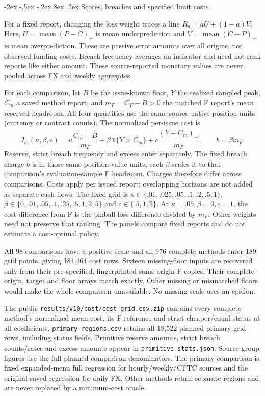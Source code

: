 \documentclass[12pt,a4paper]{article}
\makeatletter
\renewcommand\section{\@startsection{section}{1}{\z@}%
  {-2ex \@plus -.5ex \@minus -.2ex}{.8ex \@plus .2ex}%
  {\normalfont\large\bfseries}}
\makeatother
\begin{document}
\FloatBarrier


\section{Scores, breaches and specified limit costs}\label{sup:preference}\label{sup:frontier-0}\label{sup:wp3-murphy}\label{sup:v10-cost}\label{sup:v10-diagnostics}

For a fixed report, changing the loss weight traces a line
\(R_a=aU+(1-a)V\). Here, \(U=\operatorname{mean}(P-C)_+\) is mean underprediction and
\(V=\operatorname{mean}(C-P)_+\) is mean overprediction. These are passive error amounts over all
origins, not observed funding costs. Breach frequency averages an indicator and
need not rank reports like either amount. These source-reported monetary values are never pooled across FX and weekly aggregates.

For each comparison, let $B$ be the issue-known floor, $Y$ the realized sampled peak,
$C_m$ a saved method report, and $m_F=\overline{C_F-B}>0$ the matched F report's
mean reserved headroom. All four quantities use the same source-native position
units (currency or contract counts). The normalized per-issue cost is
\[
J_m(\kappa,\beta,c)=\kappa\frac{\overline{C_m-B}}{m_F}
+\beta\,\overline{\mathbf 1\{Y>C_m\}}
+c\frac{\overline{(Y-C_m)_+}}{m_F},\qquad b=\beta m_F.
\]
Reserve, strict breach frequency and excess enter separately. The fixed breach
charge $b$ is in those same position-value units; each $\beta$ scales it to that
comparison's evaluation-sample F headroom. Charges therefore differ across
comparisons. Costs apply per issued report; overlapping horizons are not
added as separate cash flows.
The fixed grid is $\kappa\in\{.01,.025,.05,.1,.2,.5,1\}$,
$\beta\in\{0,.01,.05,.1,.25,.5,1,2,5\}$ and $c\in\{.5,1,2\}$.
At $\kappa=.05,\beta=0,c=1$, the cost difference from F is the pinball-loss
difference divided by $m_F$. Other weights need not preserve that ranking.
The panels compare fixed reports and do not estimate a cost-optimal policy.

All 98 comparisons have a positive scale and all 976 complete methods enter 189 grid points, giving 184,464 cost rows. Sixteen missing-floor inputs are recovered only from their pre-specified, fingerprinted same-origin F copies. Their complete origin, target and floor arrays match exactly. Other missing or mismatched floors would make the whole comparison unavailable. No missing scale uses an epsilon.

The public \texttt{results/v10/cost/cost-grid.csv.zip} contains every complete method's normalized mean cost, its F reference and strict cheaper/equal status at all coefficients. \texttt{primary-regions.csv} retains all 18,522 planned primary grid rows, including status fields. Primitive reserve amounts, strict breach counts/rates and excess amounts appear in \texttt{primitive-stats.json}. Source-group figures use the full planned comparison denominators. The primary comparison is fixed expanded-menu full regression for hourly/weekly/CFTC sources and the original saved regression for daily FX. Other methods retain separate regions and are never replaced by a minimum-cost oracle.
\end{document}
